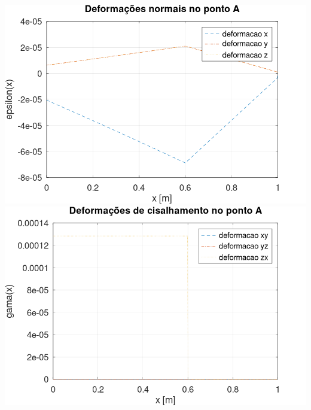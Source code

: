 \documentclass[10pt]{article}
\begin{document}
\begin{center}
    \includegraphics[scale=0.25]{figure15.png}
    \includegraphics[scale=0.25]{figure16.png}

\end{center}
\end{document}
